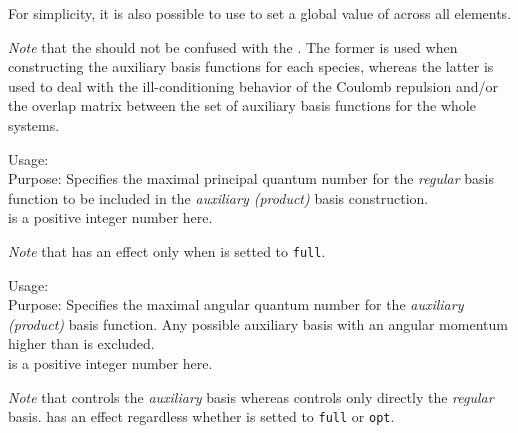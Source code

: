 For simplicity, it is also possible to use
 to set a global value of
 across all elements. 

\emph{Note} that the  should not be confused with
the . The former is used when constructing the
auxiliary basis functions for each species, whereas the latter is used to 
deal with the ill-conditioning behavior of the Coulomb repulsion and/or 
the overlap matrix between the set of auxiliary basis functions 
for the whole systems.

{
  \noindent
  Usage:   \\[1.0ex]
  Purpose: Specifies the maximal principal quantum number for the \textit{regular}
  basis function to be included in the \textit{auxiliary (product)} basis construction. 
  \\[1.0ex]
   is a positive integer number here.
} 

\emph{Note} that  has an effect only when
 is setted to \texttt{full}.

{
  \noindent
  Usage:   \\[1.0ex]
  Purpose: Specifies the maximal angular quantum number for the
  \textit{auxiliary (product)} basis function. Any possible auxiliary basis
  with an angular momentum higher than 
  is excluded.  \\[1.0ex]
   is a positive integer number here.
}

\emph{Note} that  controls the 
 \textit{auxiliary} basis whereas  
  controls only directly the \textit{regular} basis.  
 has an effect regardless whether  is setted to \texttt{full}
 or \texttt{opt}.


